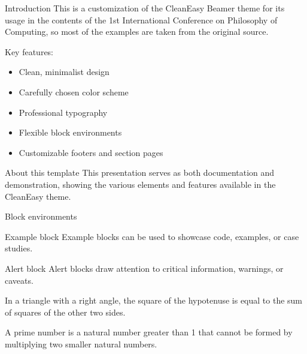 \begin{frame}{Introduction}
  This is a customization of the CleanEasy Beamer theme for its usage in the contents of the 1st International Conference on Philosophy of Computing, so most of the examples are taken from the original source.
  
  Key features:
  \begin{itemize}
    \item Clean, minimalist design
    \item Carefully chosen color scheme
    \item Professional typography
    \item Flexible block environments
    \item Customizable footers and section pages
  \end{itemize}
  
  \begin{block}{About this template}
    This presentation serves as both documentation and demonstration, showing the various elements and features available in the CleanEasy theme.
  \end{block}
\end{frame}

\begin{frame}{Block environments}

  \begin{exampleblock}{Example block}
    Example blocks can be used to showcase code, examples, or case studies.
  \end{exampleblock}
  
  \begin{alertblock}{Alert block}
    Alert blocks draw attention to critical information, warnings, or caveats.
  \end{alertblock}
  
  \begin{theorem}
    In a triangle with a right angle, the square of the hypotenuse is equal to the sum of squares of the other two sides.
  \end{theorem}
  
  \begin{definition}
    A prime number is a natural number greater than 1 that cannot be formed by multiplying two smaller natural numbers.
  \end{definition}
\end{frame}

